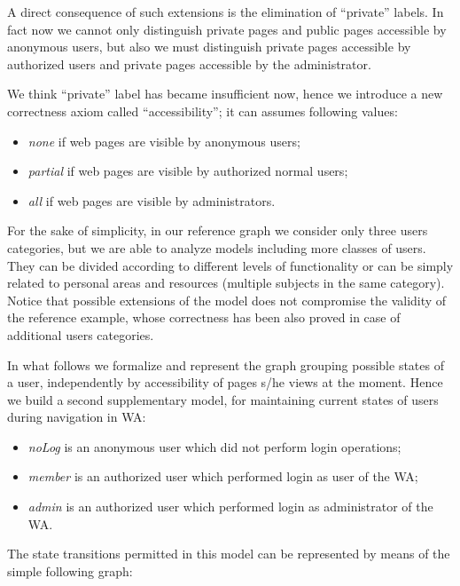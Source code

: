 A direct consequence of such extensions is the elimination of ``private'' labels. In fact now we cannot only distinguish private pages and public pages accessible by anonymous users, but also we must distinguish private pages accessible by authorized users and private pages accessible by the administrator.

We think ``private'' label has became insufficient now, hence we introduce a new correctness axiom called ``accessibility''; it can assumes following values: 

\footnotesize
\begin{itemize}  
	\item	\textit{none} if web pages are visible by anonymous users;  
	\item	\textit{partial} if web pages are visible by authorized normal users;  
	\item	\textit{all} if web pages are visible by administrators.  
\end{itemize}

\normalsize
For the sake of simplicity, in our reference graph we consider only three users categories, but we are able to analyze models including more classes of users. They can be divided according to different levels of functionality or can be simply related to personal areas and resources (multiple subjects in the same category). Notice that possible extensions of the model does not compromise the validity of the reference example, whose correctness has been also proved in case of additional users categories.

In what follows we formalize and represent the graph grouping possible states of a user, independently by accessibility of pages s/he views at the moment. Hence we build a second supplementary model, for maintaining current states of users during navigation in WA: 

\footnotesize
\begin{itemize}  
	\item \textit{noLog} is an anonymous user which did not perform login operations;  
	\item \textit{member} is an authorized user which performed login as user of the WA;  
	\item \textit{admin} is an authorized user which performed login as administrator of the WA.  
\end{itemize}	

\normalsize
The state transitions permitted in this model can be represented by means of the simple following graph: 

